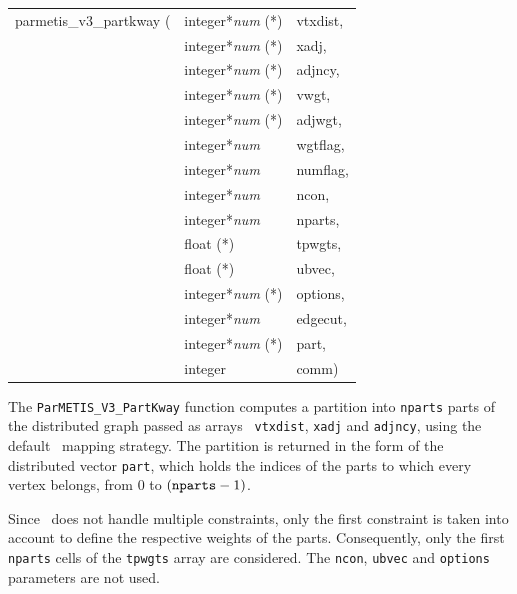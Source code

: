 \begin{itemize}
{\tt\begin{tabular}{l@{}ll}
parmetis\_v3\_partkway ( & integer*{\it num} (*) & vtxdist, \\
                         & integer*{\it num} (*) & xadj, \\
                         & integer*{\it num} (*) & adjncy, \\
                         & integer*{\it num} (*) & vwgt, \\
                         & integer*{\it num} (*) & adjwgt, \\
                         & integer*{\it num}     & wgtflag, \\
                         & integer*{\it num}     & numflag, \\
                         & integer*{\it num}     & ncon, \\
                         & integer*{\it num}     & nparts, \\
                         & float (*)             & tpwgts, \\
                         & float (*)             & ubvec, \\
                         & integer*{\it num} (*) & options, \\
                         & integer*{\it num}     & edgecut, \\
                         & integer*{\it num} (*) & part, \\
                         & integer               & comm)
\end{tabular}}

\progdes

The {\tt ParMETIS\_V3\_PartKway} function computes a partition into
{\tt nparts} parts of the distributed graph passed as arrays {\tt
vtxdist}, {\tt xadj} and {\tt adjncy}, using the default
\ptscotch\ mapping strategy. The partition is returned in the form of
the distributed vector {\tt part}, which holds the indices of the
parts to which every vertex belongs, from $0$ to $(\mbox{\tt nparts} -
1)$.

Since \scotch\ does not handle multiple constraints, only the first
constraint is taken into account to define the respective weights of
the parts. Consequently, only the first {\tt nparts} cells of the
{\tt tpwgts} array are considered. The {\tt ncon}, {\tt ubvec}
and {\tt options} parameters are not used.
\end{itemize}
